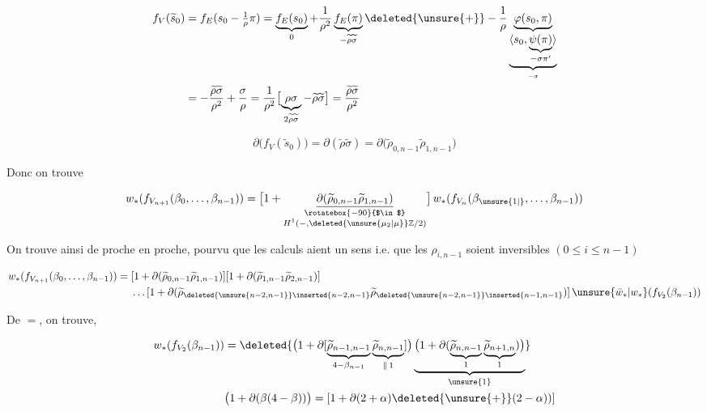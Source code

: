 \[\begin{aligned}f_V(\widetilde s_0)&=f_E(s_0-\tfrac1\rho\pi)=\underbrace{f_E(s_0)}_{0}+\frac1{\rho^2}\underbrace{f_E(\pi)}_{-\widetilde\rho\widetilde\sigma}\deleted{\unsure{+}}-\frac1\rho\underbrace{\varphi(s_0,\pi)}_{\underbrace{\langle s_0,\underbrace{\psi(\pi)}_{-\sigma\pi'}\rangle}_{-\sigma}}\\ &=-\frac{\widetilde\rho\widetilde\sigma}{\rho^2}+\frac{\sigma}{\rho}=\frac1{\rho^2}\bigl[\underbrace{\rho\sigma}_{2\widetilde\rho\widetilde\sigma}-\widetilde\rho\widetilde\sigma\bigr]=\frac{\widetilde\rho\widetilde\sigma}{\rho^2}\end{aligned}\]

\[\partial\bigl(f_V(\widetilde s_0)\bigr)=\partial(\widetilde\rho\widetilde\sigma)=\partial\bigl(\widetilde\rho_{0,n-1}\widetilde\rho_{1,n-1}\bigr)\]



Donc on trouve

\[w_*(f_{V_{n+1}}(\beta_0,\ldots,\beta_{n-1}))=\bigl[1+\underset{\substack{\rotatebox{-90}{$\in$}\\ H^1(-,\deleted{\unsure{\mu_2|\mu}}\mathbb Z/2)}}{\underline{\partial(\widetilde\rho_{0,n-1}\widetilde\rho_{1,n-1})}}\bigr]\,w_*(f_{V_n}(\beta_{\unsure{1|{}}},\ldots,\beta_{n-1}))\]

On trouve ainsi de proche en proche, pourvu que les calculs aient un sens i.e. que  les $\rho_{i,n-1}$ soient inversibles $(0\leq i\leq n-1)$

\[\begin{aligned}w_*(f_{V_{n+1}}(\beta_0,\ldots,\beta_{n-1}))={}&[1+\partial(\widetilde\rho_{0,n-1}\widetilde\rho_{1,n-1})][1+\partial(\widetilde\rho_{1,n-1}\widetilde\rho_{2,n-1})]\\ &\ldots[1+\partial(\widetilde\rho_{\deleted{\unsure{n-2,n-1}}\inserted{n-2,n-1}}\widetilde\rho_{\deleted{\unsure{n-2,n-1}}\inserted{n-1,n-1}})]\,\unsure{\bar w_*|w_*}(f_{V_2}(\beta_{n-1}))\end{aligned}\]

De $=$, on trouve,

\[\begin{aligned}w_*(f_{V_2}(\beta_{n-1}))&=\deleted{\bigl(1+\partial[\underbrace{\widetilde\rho_{n-1,n-1}}_{4-\beta_{n-1}}\underbrace{\widetilde\rho_{n,n-1}}_{\Vert\,1}]\bigr)\underbrace{\bigl(1+\partial(\underbrace{\widetilde\rho_{n,n-1}}_{1}\underbrace{\widetilde\rho_{n+1,n}}_{1})\bigr)}_{\unsure{1}}}\\ &\bigl(1+\partial(\beta(4-\beta))\bigr)=[1+\partial(2+\alpha)\deleted{\unsure{+}}(2-\alpha))]\end{aligned}\]

